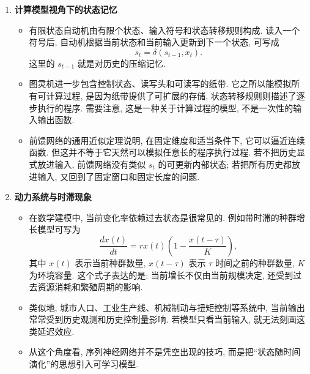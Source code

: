 \documentclass{../nndlcourse}
\begin{document}
\begin{enumerate}
  \item \textbf{计算模型视角下的状态记忆}
    \begin{itemize}
      \item 有限状态自动机由有限个状态、输入符号和状态转移规则构成. 读入一个符号后, 自动机根据当前状态和当前输入更新到下一个状态, 可写成
      \begin{equation*}
        s_t = \delta(s_{t-1}, x_t).
      \end{equation*}
      这里的 $s_{t-1}$ 就是对历史的压缩记忆.
      \item 图灵机进一步包含控制状态、读写头和可读写的纸带. 它之所以能模拟所有可计算过程, 是因为纸带提供了可扩展的存储, 状态转移规则则描述了逐步执行的程序. 需要注意, 这是一种关于计算过程的模型, 不是一次性的输入输出函数.
      \item 前馈网络的通用近似定理说明, 在固定维度和适当条件下, 它可以逼近连续函数. 但这并不等于它天然可以模拟任意长的程序执行过程. 若不把历史显式放进输入, 前馈网络没有类似 $s_t$ 的可更新内部状态; 若把所有历史都放进输入, 又回到了固定窗口和固定长度的问题.
    \end{itemize}

  \item \textbf{动力系统与时滞现象}
    \begin{itemize}
      \item 在数学建模中, 当前变化率依赖过去状态是很常见的. 例如带时滞的种群增长模型可写为
      \begin{equation*}
        \frac{d x(t)}{dt} = r x(t)\left(1 - \frac{x(t-\tau)}{K}\right),
      \end{equation*}
      其中 $x(t)$ 表示当前种群数量, $x(t-\tau)$ 表示 $\tau$ 时间之前的种群数量, $K$ 为环境容量. 这个式子表达的是: 当前增长不仅由当前规模决定, 还受到过去资源消耗和繁殖周期的影响.
      \item 类似地, 城市人口、工业生产线、机械制动与扭矩控制等系统中, 当前输出常常受到历史观测和历史控制量影响. 若模型只看当前输入, 就无法刻画这类延迟效应.
      \item 从这个角度看, 序列神经网络并不是凭空出现的技巧, 而是把“状态随时间演化”的思想引入可学习模型.
    \end{itemize}


\end{enumerate}
\end{document}
